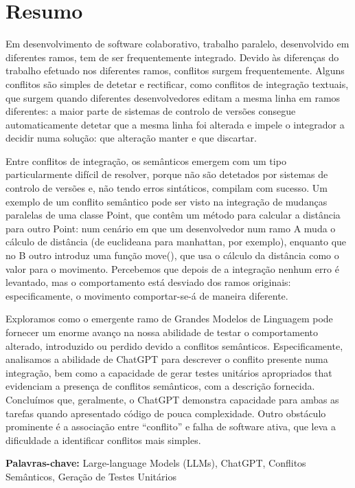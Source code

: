 \chapter*{Resumo}

Em desenvolvimento de software colaborativo, trabalho paralelo, desenvolvido em diferentes ramos, tem de ser frequentemente integrado. Devido às diferenças do trabalho efetuado nos diferentes ramos, conflitos surgem frequentemente. Alguns conflitos são simples de detetar e rectificar, como conflitos de integração textuais, que surgem quando diferentes desenvolvedores editam a mesma linha em ramos diferentes: a maior parte de sistemas de controlo de versões consegue automaticamente detetar que a mesma linha foi alterada e impele o integrador a decidir numa solução: que alteração manter e que discartar.

Entre conflitos de integração, os semânticos emergem com um tipo particularmente difícil de resolver, porque não são detetados por sistemas de controlo de versões e, não tendo erros sintáticos, compilam com sucesso. 
Um exemplo de um conflito semântico pode ser visto na integração de mudanças paralelas de uma classe Point, que contêm um método para calcular a distância para outro Point: num cenário em que um desenvolvedor num ramo A muda o cálculo de distância (de euclideana para manhattan, por exemplo), enquanto que no B outro introduz uma função move(), que usa o cálculo da distância como o valor para o movimento. Percebemos que depois de a integração nenhum erro é levantado, mas o comportamento está desviado dos ramos originais: especificamente, o movimento comportar-se-á de maneira diferente.

Exploramos como o emergente ramo de Grandes Modelos de Linguagem pode fornecer um enorme avanço na nossa abilidade de testar o comportamento alterado, introduzido ou perdido devido a conflitos semânticos.
Especificamente, analisamos a abilidade de ChatGPT para descrever o conflito presente numa integração, bem como a capacidade de gerar testes unitários apropriados that evidenciam a presença de conflitos semânticos, com a descrição fornecida.
Concluímos que, geralmente, o ChatGPT demonstra capacidade para ambas as tarefas quando apresentado código de pouca complexidade. Outro obstáculo prominente é a associação entre ``conflito'' e falha de software ativa, que leva a 
dificuldade a identificar conflitos mais simples.

\bigskip\noindent
\textbf{Palavras-chave:} Large-language Models (LLMs), ChatGPT, Conflitos Semânticos, Geração de Testes Unitários

